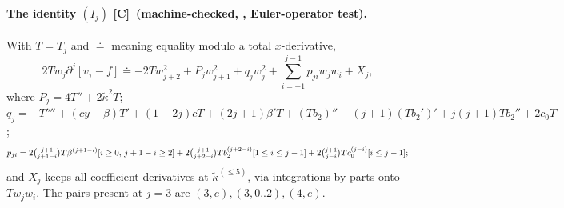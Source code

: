 \documentclass[11pt]{article}
\theoremstyle{definition}
\theoremstyle{remark}
\newcommand{\fn}[1]{\texttt{\detokenize{#1}}}
\newcommand{\tC}{\textnormal{\textsc{[C]}}}
\newcommand{\kt}{\tilde\kappa}
\begin{document}
\paragraph{The identity $(I_j)$ \tC\ (machine-checked, \fn{lfsym.py}, Euler-operator test).} With $T=T_j$ and $\doteq$ meaning equality modulo a total $x$-derivative,
\[
2Tw_j\partial^j[v_\tau-f]\doteq-2Tw_{j+2}^2+P_jw_{j+1}^2+q_jw_j^2+\sum_{i=-1}^{j-1}p_{ji}w_jw_i+X_j,
\]
where $P_j=4T''+2\kt^2T$; $q_j=-T''''+(cy-\beta)T'+(1-2j)cT+(2j+1)\beta'T+(Tb_2)''-(j+1)(Tb_2')'+j(j+1)Tb_2''+2c_0T$;
\[
p_{ji}=2\tbinom{j+1}{j+1-i}T\beta^{(j+1-i)}[i\ge0,\,j+1-i\ge2]+2\tbinom{j+1}{j+2-i}Tb_2^{(j+2-i)}[1\le i\le j-1]+2\tbinom{j+1}{j-i}Tc_0^{(j-i)}[i\le j-1];
\]
and $X_j$ keeps all coefficient derivatives at $\kt^{(\le5)}$, via integrations by parts onto $Tw_jw_i$. The pairs present at $j=3$ are $(3,e),(3,0..2),(4,e)$.
\end{document}
